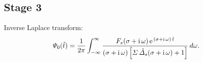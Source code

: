 \documentclass[titlepage=false,12pt]{article}
\begin{document}
\subsection{Stage 3}
Inverse Laplace transform:
\begin{equation}
{\mit\Psi}_0(\hat{t}) = \frac{1}{2\pi}\int_{-\infty}^{\infty}
\frac{F_s(\sigma+{\rm i}\,\omega)\,{\rm e}^{\,(\sigma+{\rm i}\,\omega)\,\hat{t}}}{(\sigma+{\rm i}\,\omega)\left[{\mit\Sigma}\,\hat{\mit\Delta}_s(\sigma+{\rm i}\,\omega)+1\right]}\,d\omega.
\end{equation}
\end{document}

